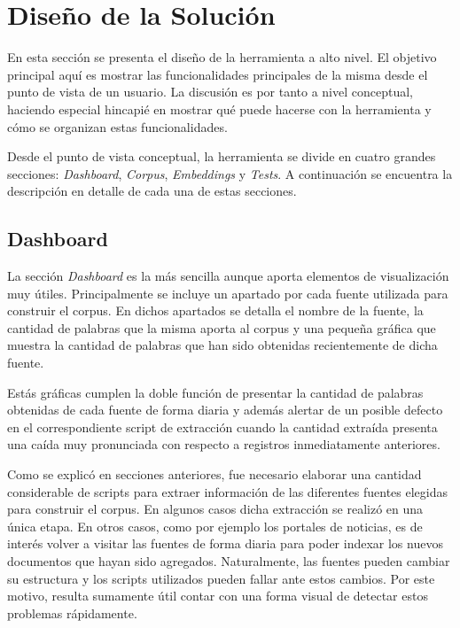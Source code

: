 \section{Diseño de la Solución}

En esta sección se presenta el diseño de la herramienta a alto nivel. El objetivo principal aquí es
mostrar las funcionalidades principales de la misma desde el punto de vista de un usuario. La discusión
es por tanto a nivel conceptual, haciendo especial hincapié en mostrar qué puede hacerse con la herramienta
y cómo se organizan estas funcionalidades.

Desde el punto de vista conceptual, la herramienta se divide en cuatro grandes secciones:
\textit{Dashboard}, \textit{Corpus}, \textit{Embeddings} y \textit{Tests}. A continuación se encuentra la
descripción en detalle de cada una de estas secciones.

\subsection{Dashboard}

La sección \textit{Dashboard} es la más sencilla aunque aporta elementos de visualización muy útiles.
Principalmente se incluye un apartado por cada fuente utilizada para construir el corpus. En dichos
apartados se detalla el nombre de la fuente, la cantidad de palabras que la misma aporta al corpus y una
pequeña gráfica que muestra la cantidad de palabras que han sido obtenidas recientemente de dicha fuente.

Estás gráficas cumplen la doble función de presentar la cantidad de palabras obtenidas de cada fuente de
forma diaria y además alertar de un posible defecto en el correspondiente script de extracción cuando la
cantidad extraída presenta una caída muy pronunciada con respecto a registros inmediatamente anteriores.

Como se explicó en secciones anteriores, fue necesario elaborar una cantidad considerable de scripts para
extraer información de las diferentes fuentes elegidas para construir el corpus. En algunos casos dicha
extracción se realizó en una única etapa. En otros casos, como por ejemplo los portales de noticias, es de
interés volver a visitar las fuentes de forma diaria para poder indexar los nuevos documentos que hayan
sido agregados. Naturalmente, las fuentes pueden cambiar su estructura y los scripts utilizados pueden
fallar ante estos cambios. Por este motivo, resulta sumamente útil contar con una forma visual de detectar
estos problemas rápidamente.

